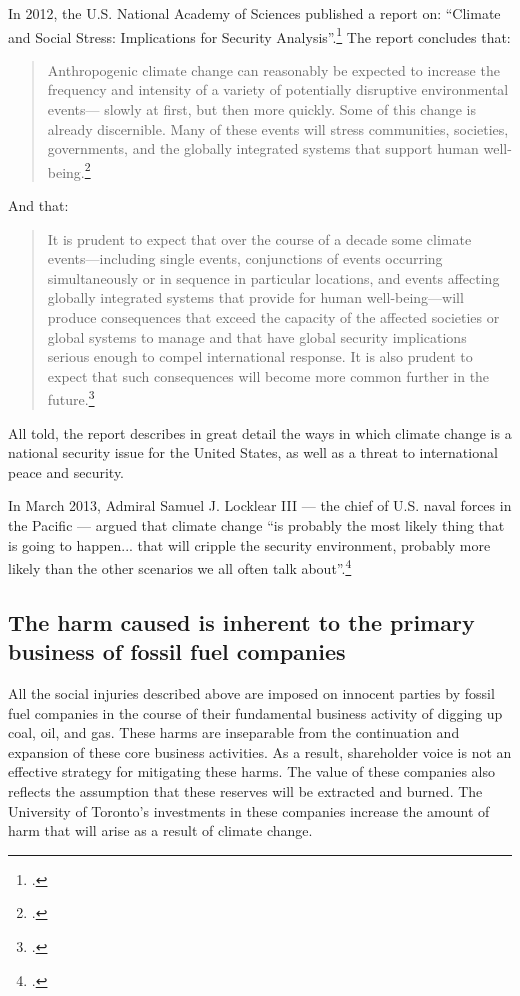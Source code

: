 In 2012, the U.S. National Academy of Sciences published a report on: ``Climate and Social Stress: Implications for Security Analysis''.\footcite[][]{SocialStress}
The report concludes that:
\begin{quote}
Anthropogenic climate change can reasonably be expected to increase the frequency and intensity of a variety of potentially disruptive environmental events— slowly at first, but then more quickly. Some of this change is already discernible. Many of these events will stress communities, societies, governments, and the globally integrated systems that support human well-being.\footcite[][p. S-2]{SocialStress}
\end{quote}
And that:
\begin{quote}
It is prudent to expect that over the course of a decade some climate events—including single events, conjunctions of events occurring simultaneously or in sequence in particular locations, and events affecting globally integrated systems that provide for human well-being—will produce consequences that exceed the capacity of the affected societies or global systems to manage and that have global security implications serious enough to compel international response. It is also prudent to expect that such consequences will become more common further in the future.\footcite[][p. S-4]{SocialStress}
\end{quote}
All told, the report describes in great detail the ways in which climate change is a national security issue for the United States, as well as a threat to international peace and security.


In March 2013, Admiral Samuel J. Locklear III --- the chief of U.S. naval forces in the Pacific --- argued that climate change ``is probably the most likely thing that is going to happen... that will cripple the security environment, probably more likely than the other scenarios we all often talk about''.\footcite[][]{PacificChiefWorry}



	\subsection{The harm caused is inherent to the primary business of fossil fuel companies}



All the social injuries described above are imposed on innocent parties by fossil fuel companies in the course of their fundamental business activity of digging up coal, oil, and gas.
These harms are inseparable from the continuation and expansion of these core business activities.
As a result, shareholder voice is not an effective strategy for mitigating these harms. 
The value of these companies also reflects the assumption that these reserves will be extracted and burned.
The University of Toronto's investments in these companies increase the amount of harm that will arise as a result of climate change.



